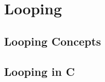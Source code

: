 \chapter{Looping} %
\label{cha:looping}

\minitoc

\section{Looping Concepts} %
\label{sec:looping_concepts}







\clearpage
\section{Looping in C} %
\label{sec:looping_in_c}








